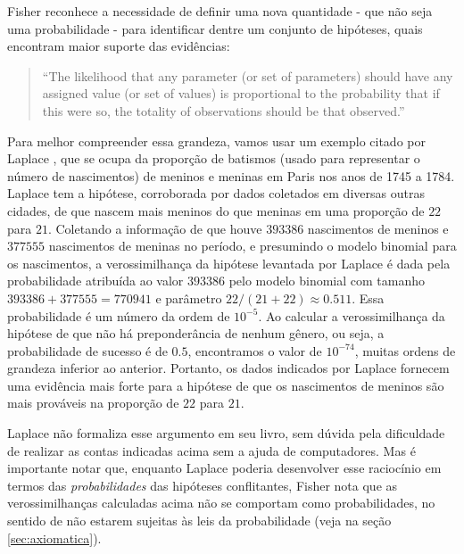 Fisher reconhece a necessidade de definir uma nova quantidade - que não seja uma probabilidade - para
identificar dentre um conjunto de hipóteses, quais encontram maior suporte das evidências:

\begin{quote}
``The likelihood that any parameter (or set of parameters) should have
any assigned value (or set of values) is proportional to the probability
that if this were so, the totality of observations should be that observed.''\citep{Fisher1922}
\end{quote}

Para melhor compreender essa grandeza, vamos usar um exemplo citado por Laplace \citep{Laplace1814}, que se ocupa da 
proporção de batismos (usado para representar o número de nascimentos) de meninos e meninas em Paris nos anos 
de 1745 a 1784. Laplace tem a hipótese, corroborada por dados coletados em diversas outras cidades, de que nascem mais meninos
do que meninas em uma proporção de $22$ para $21$. Coletando a
informação de que houve $393386$ nascimentos de meninos e $377555$
nascimentos de meninas no período, e presumindo o modelo binomial para os nascimentos, a verossimilhança da hipótese levantada
por Laplace é dada pela probabilidade atribuída ao valor $393386$ pelo modelo binomial com tamanho $393386 + 377555 = 770941$
e parâmetro $22/(21+22) \approx 0.511$. Essa probabilidade é um número da ordem de $10^{-5}$. Ao calcular a 
verossimilhança da hipótese de que não há preponderância de nenhum gênero, ou seja, a probabilidade de sucesso é de $0.5$, 
encontramos o valor de $10^{-74}$, muitas ordens de grandeza inferior ao anterior. Portanto, os dados indicados por Laplace
fornecem uma evidência mais forte para a hipótese de que os nascimentos de meninos são mais prováveis na proporção de $22$
para $21$. 

Laplace não formaliza esse argumento em seu livro, sem dúvida pela dificuldade de realizar as contas indicadas acima sem
a ajuda de computadores. Mas é importante notar que, enquanto Laplace poderia desenvolver esse raciocínio em termos das 
{\em probabilidades} das hipóteses conflitantes, Fisher nota que as verossimilhanças calculadas acima não se comportam como 
probabilidades, no sentido de não estarem sujeitas às leis da
probabilidade (veja na seção \ref{sec:axiomatica}).

